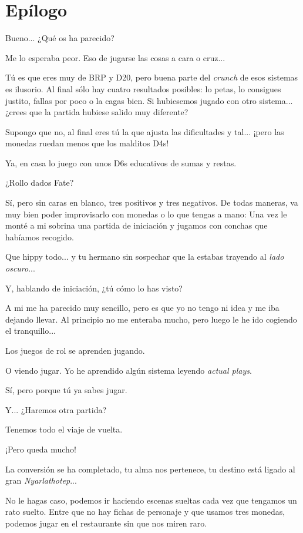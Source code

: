 \documentclass[10pt, a5paper, twocolumn]{article}
\newenvironment{dialogue}
    {\begin{description}[leftmargin=!,align=right,labelwidth=0.cm]}
    {\end{description}}
\newcommand\A{\item[\raisebox{-0.25em}{\scalebox{0.75}{\bctetraedre}}]}
\newcommand\B{\item[\raisebox{-0.25em}{\scalebox{0.75}{\bccube}}]}
\newcommand\E{\item[\raisebox{-0.25em}{\scalebox{0.75}{\bcicosaedre}}]}
\begin{document}
    \section*{Epílogo} %

    \begin{dialogue}
        \E Bueno... ¿Qué os ha parecido?
        \B Me lo esperaba peor. Eso de jugarse las cosas a cara o cruz...
        \E Tú es que eres muy de BRP y D20, pero buena parte del \emph{crunch} de esos sistemas es ilusorio. Al final sólo hay cuatro resultados posibles: lo petas, lo consigues justito, fallas por poco o la cagas bien. Si hubiesemos jugado con otro sistema... ¿crees que la partida hubiese salido muy diferente?
        \B Supongo que no, al final eres tú la que ajusta las dificultades y tal... ¡pero las monedas ruedan menos que los malditos D4s!
        \E Ya, en casa lo juego con unos D6s educativos de sumas y restas.
        \B ¿Rollo dados Fate?
        \E Sí, pero sin caras en blanco, tres positivos y tres negativos. De todas maneras, va muy bien poder improvisarlo con monedas o lo que tengas a mano: Una vez le monté a mi sobrina una partida de iniciación y jugamos con conchas que habíamos recogido.
        \B Que hippy todo... y tu hermano sin sospechar que la estabas trayendo al \emph{lado oscuro}...
        \E Y, hablando de iniciación, ¿tú cómo lo has visto?
        \A A mi me ha parecido muy sencillo, pero es que yo no tengo ni idea y me iba dejando llevar. Al principio no me enteraba mucho, pero luego le he ido cogiendo el tranquillo...
        \E Los juegos de rol se aprenden jugando.
        \B O viendo jugar. Yo he aprendido algún sistema leyendo \emph{actual plays}.
        \E Sí, pero porque tú ya sabes jugar.
        \A Y... ¿Haremos otra partida?
        \E Tenemos todo el viaje de vuelta.
        \A ¡Pero queda mucho!
        \B La conversión se ha completado, tu alma nos pertenece, tu destino está ligado al gran \emph{Nyarlathotep}...
        \E No le hagas caso, podemos ir haciendo escenas sueltas cada vez que tengamos un rato suelto. Entre que no hay fichas de personaje y que usamos tres monedas, podemos jugar en el restaurante sin que nos miren raro.
    \end{dialogue}
\end{document}
